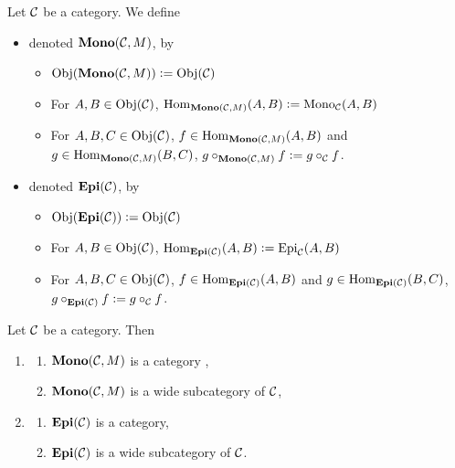 \documentclass{book}
\begin{document}
	\begin{defn}
		Let $\MC$ be a category. We define 
		\begin{itemize}
			\item {} denoted $\bMono(\MC, M)$, by
			\begin{itemize}
				\item $\Obj(\bMono(\MC, M)) \defeq \Obj(\MC)$
				\item For $A,B \in \Obj(\MC)$, $\Hom_{\bMono(\MC, M)}(A,B) \defeq \Mono_{\MC}(A,B)$
				\item For $A,B, C \in \Obj(\MC)$, $f \in \Hom_{\bMono(\MC, M)}(A, B)$ and $g \in \Hom_{\bMono(\MC, M)}(B, C)$, $g \circ_{\bMono(\MC, M)} f \defeq g \circ_{\MC} f$.
			\end{itemize}
			\item {} denoted $\bEpi(\MC)$, by
			\begin{itemize}
				\item $\Obj(\bEpi(\MC)) \defeq \Obj(\MC)$
				\item For $A,B \in \Obj(\MC)$, $\Hom_{\bEpi(\MC)}(A,B) \defeq \Epi_{\MC}(A,B)$
				\item For $A,B, C \in \Obj(\MC)$, $f \in \Hom_{\bEpi(\MC)}(A, B)$ and $g \in \Hom_{\bEpi(\MC)}(B, C)$, $g \circ_{\bEpi(\MC)} f \defeq g \circ_{\MC} f$.
			\end{itemize}
		\end{itemize}
	\end{defn}
	
	\begin{ex}
		Let $\MC$ be a category. Then 
		\begin{enumerate}
			\item 
			\begin{enumerate}
				\item $\bMono(\MC, M)$ is a category ,
				\item $\bMono(\MC, M)$ is a wide subcategory of $\MC$,
			\end{enumerate}
			\item 
			\begin{enumerate}
				\item $\bEpi(\MC)$ is a category,
				\item $\bEpi(\MC)$ is a wide subcategory of $\MC$.
			\end{enumerate}
		\end{enumerate}
	\end{ex}
	
\end{document}

